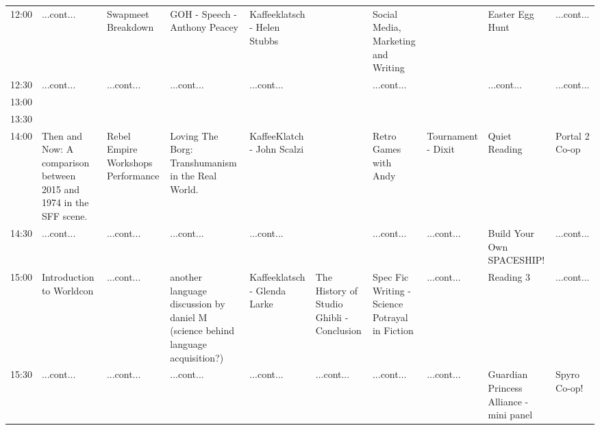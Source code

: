 \documentclass{scrreprt}
\begin{document}
\begin{landscape}
\begin{tabular}{c||p{25mm}|p{25mm}|p{25mm}|p{25mm}|p{25mm}|p{25mm}|p{25mm}|p{25mm}|p{25mm}|}
12:00&\cellcolor[gray]{0.655694} ...cont...&\cellcolor[gray]{0.757008} Swapmeet Breakdown&\cellcolor[gray]{0.583630} GOH - Speech - Anthony Peacey&\cellcolor[gray]{0.527064} Kaffeeklatsch - Helen Stubbs&&\cellcolor[gray]{0.868349} Social Media, Marketing and Writing&&\cellcolor[gray]{0.506717} Easter Egg Hunt&\cellcolor[gray]{0.711113} ...cont...\\
12:30&\cellcolor[gray]{0.655694} ...cont...&\cellcolor[gray]{0.757008} ...cont...&\cellcolor[gray]{0.583630} ...cont...&\cellcolor[gray]{0.527064} ...cont...&&\cellcolor[gray]{0.868349} ...cont...&&\cellcolor[gray]{0.506717} ...cont...&\cellcolor[gray]{0.711113} ...cont...\\
13:00&&&&&&&&&\\
13:30&&&&&&&&&\\
14:00&\cellcolor[gray]{0.851659} Then and Now: A comparison between 2015 and 1974 in the SFF scene.&\cellcolor[gray]{0.664435} Rebel Empire Workshops Performance&\cellcolor[gray]{0.624722} Loving The Borg: Transhumanism in the Real World.&\cellcolor[gray]{0.696343} KaffeeKlatch - John Scalzi&&\cellcolor[gray]{0.652298} Retro Games with Andy&\cellcolor[gray]{0.969802} Tournament - Dixit&\cellcolor[gray]{0.598056} Quiet Reading&\cellcolor[gray]{0.948003} Portal 2 Co-op\\
14:30&\cellcolor[gray]{0.851659} ...cont...&\cellcolor[gray]{0.664435} ...cont...&\cellcolor[gray]{0.624722} ...cont...&\cellcolor[gray]{0.696343} ...cont...&&\cellcolor[gray]{0.652298} ...cont...&\cellcolor[gray]{0.969802} ...cont...&\cellcolor[gray]{0.735017} Build Your Own SPACESHIP!&\cellcolor[gray]{0.948003} ...cont...\\
15:00&\cellcolor[gray]{0.525659} Introduction to Worldcon&\cellcolor[gray]{0.664435} ...cont...&\cellcolor[gray]{0.796783} another language discussion by daniel M (science behind language acquisition?)&\cellcolor[gray]{0.628931} Kaffeeklatsch - Glenda Larke&\cellcolor[gray]{0.626704} The History of Studio Ghibli - Conclusion&\cellcolor[gray]{0.782990} Spec Fic Writing - Science Potrayal in Fiction&\cellcolor[gray]{0.969802} ...cont...&\cellcolor[gray]{0.895187} Reading 3&\cellcolor[gray]{0.948003} ...cont...\\
15:30&\cellcolor[gray]{0.525659} ...cont...&\cellcolor[gray]{0.664435} ...cont...&\cellcolor[gray]{0.796783} ...cont...&\cellcolor[gray]{0.628931} ...cont...&\cellcolor[gray]{0.626704} ...cont...&\cellcolor[gray]{0.782990} ...cont...&\cellcolor[gray]{0.969802} ...cont...&\cellcolor[gray]{0.972735} Guardian Princess Alliance - mini panel&\cellcolor[gray]{0.883664} Spyro Co-op!\\

\end{tabular}
\end{landscape}
\end{document}
